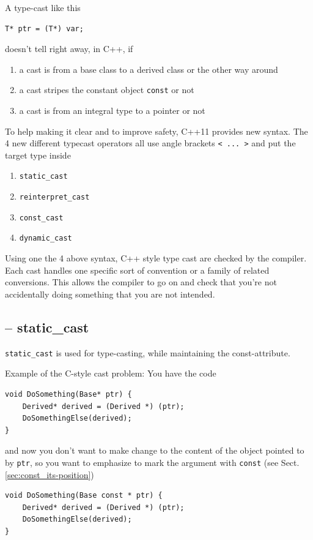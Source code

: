 A type-cast like this
\begin{verbatim}
T* ptr = (T*) var;
\end{verbatim}
doesn't tell right away, in C++, if 
\begin{enumerate}
  \item a cast is from a base class to a derived class or the other way around
  \item a cast stripes the constant object \verb!const! or not
  \item a cast is from an integral type to a pointer or not 
\end{enumerate}

To help making it clear and to improve safety, C++11 provides new syntax. The 4
new different typecast operators all use angle brackets \verb!< ... >! and put the target type inside
\begin{enumerate}
  \item \verb!static_cast!
  \item \verb!reinterpret_cast!
  \item \verb!const_cast!
  \item \verb!dynamic_cast!
\end{enumerate}
Using one the 4 above syntax, C++ style type cast are checked
by the compiler. Each cast handles one specific sort
of convention or a family of related conversions. This allows the compiler to go on
and check that you're not accidentally doing something that you are not
intended.


\subsection{-- static\_cast}
\label{sec:static_cast}

\verb!static_cast! is used for type-casting, while maintaining the
const-attribute. 

Example of the C-style cast problem: You have the code
\begin{verbatim}
void DoSomething(Base* ptr) {
    Derived* derived = (Derived *) (ptr);
    DoSomethingElse(derived);
}
\end{verbatim}
and now you don't want to make change to the content of the object pointed to
by \verb!ptr!, so you want to emphasize to mark the argument with \verb!const!
(see Sect.\ref{sec:const_its-position})

\begin{verbatim}
void DoSomething(Base const * ptr) {
    Derived* derived = (Derived *) (ptr);
    DoSomethingElse(derived);
}
\end{verbatim}

